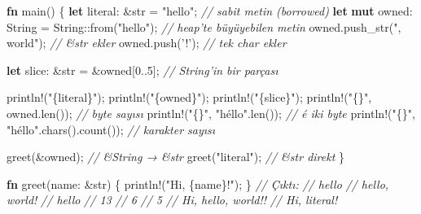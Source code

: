 \documentclass[12pt,a4paper]{article}
\newenvironment{Shaded}{}{}
\newcommand{\CharTok}[1]{\textcolor[rgb]{0.25,0.44,0.63}{#1}}
\newcommand{\CommentTok}[1]{\textcolor[rgb]{0.38,0.63,0.69}{\textit{#1}}}
\newcommand{\DataTypeTok}[1]{\textcolor[rgb]{0.56,0.13,0.00}{#1}}
\newcommand{\DecValTok}[1]{\textcolor[rgb]{0.25,0.63,0.44}{#1}}
\newcommand{\FunctionTok}[1]{\textcolor[rgb]{0.02,0.16,0.49}{#1}}
\newcommand{\KeywordTok}[1]{\textcolor[rgb]{0.00,0.44,0.13}{\textbf{#1}}}
\newcommand{\NormalTok}[1]{#1}
\newcommand{\OperatorTok}[1]{\textcolor[rgb]{0.40,0.40,0.40}{#1}}
\newcommand{\StringTok}[1]{\textcolor[rgb]{0.25,0.44,0.63}{#1}}
\begin{document}
\begin{Shaded}
\begin{Highlighting}[]
\KeywordTok{fn} \FunctionTok{main}\OperatorTok{()} \OperatorTok{\{}
    \KeywordTok{let}\NormalTok{ literal}\OperatorTok{:} \OperatorTok{\&}\DataTypeTok{str} \OperatorTok{=} \StringTok{"hello"}\OperatorTok{;}                    \CommentTok{// sabit metin (borrowed)}
    \KeywordTok{let} \KeywordTok{mut}\NormalTok{ owned}\OperatorTok{:} \DataTypeTok{String} \OperatorTok{=} \DataTypeTok{String}\OperatorTok{::}\FunctionTok{from}\OperatorTok{(}\StringTok{"hello"}\OperatorTok{);}  \CommentTok{// heap'te büyüyebilen metin}
\NormalTok{    owned}\OperatorTok{.}\FunctionTok{push\_str}\OperatorTok{(}\StringTok{", world"}\OperatorTok{);}                      \CommentTok{// \&str ekler}
\NormalTok{    owned}\OperatorTok{.}\FunctionTok{push}\OperatorTok{(}\CharTok{'!'}\OperatorTok{);}                                \CommentTok{// tek char ekler}

    \KeywordTok{let}\NormalTok{ slice}\OperatorTok{:} \OperatorTok{\&}\DataTypeTok{str} \OperatorTok{=} \OperatorTok{\&}\NormalTok{owned}\OperatorTok{[}\DecValTok{0}\OperatorTok{..}\DecValTok{5}\OperatorTok{];}                 \CommentTok{// String'in bir parçası}

\NormalTok{    println}\OperatorTok{!(}\StringTok{"\{literal\}"}\OperatorTok{);}
\NormalTok{    println}\OperatorTok{!(}\StringTok{"\{owned\}"}\OperatorTok{);}
\NormalTok{    println}\OperatorTok{!(}\StringTok{"\{slice\}"}\OperatorTok{);}
\NormalTok{    println}\OperatorTok{!(}\StringTok{"\{\}"}\OperatorTok{,}\NormalTok{ owned}\OperatorTok{.}\FunctionTok{len}\OperatorTok{());}                    \CommentTok{// byte sayısı}
\NormalTok{    println}\OperatorTok{!(}\StringTok{"\{\}"}\OperatorTok{,} \StringTok{"héllo"}\OperatorTok{.}\FunctionTok{len}\OperatorTok{());}                  \CommentTok{// é iki byte}
\NormalTok{    println}\OperatorTok{!(}\StringTok{"\{\}"}\OperatorTok{,} \StringTok{"héllo"}\OperatorTok{.}\FunctionTok{chars}\OperatorTok{().}\FunctionTok{count}\OperatorTok{());}        \CommentTok{// karakter sayısı}

    \FunctionTok{greet}\OperatorTok{(\&}\NormalTok{owned}\OperatorTok{);}                                  \CommentTok{// \&String → \&str}
    \FunctionTok{greet}\OperatorTok{(}\StringTok{"literal"}\OperatorTok{);}                               \CommentTok{// \&str direkt}
\OperatorTok{\}}

\KeywordTok{fn} \FunctionTok{greet}\OperatorTok{(}\NormalTok{name}\OperatorTok{:} \OperatorTok{\&}\DataTypeTok{str}\OperatorTok{)} \OperatorTok{\{}
\NormalTok{    println}\OperatorTok{!(}\StringTok{"Hi, \{name\}!"}\OperatorTok{);}
\OperatorTok{\}}
\CommentTok{// Çıktı:}
\CommentTok{// hello}
\CommentTok{// hello, world!}
\CommentTok{// hello}
\CommentTok{// 13}
\CommentTok{// 6}
\CommentTok{// 5}
\CommentTok{// Hi, hello, world!!}
\CommentTok{// Hi, literal!}
\end{Highlighting}
\end{Shaded}
\end{document}
